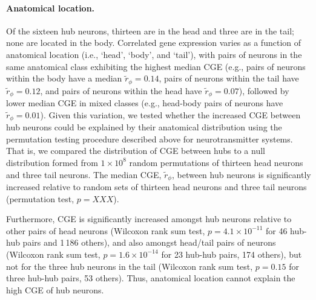 \documentclass[10pt,letterpaper]{article}
\begin{document}
{\paragraph{Anatomical location.}
Of the sixteen hub neurons, thirteen are in the head and three are in the tail; none are located in the body.
Correlated gene expression varies as a function of anatomical location (i.e., `head', `body', and `tail'), with pairs of neurons in the same anatomical class exhibiting the highest median CGE (e.g., pairs of neurons within the body have a median $\tilde{r}_\phi = 0.14$, pairs of neurons within the tail have $\tilde{r}_\phi = 0.12$, and pairs of neurons within the head have $\tilde{r}_\phi = 0.07$), followed by lower median CGE in mixed classes (e.g., head-body pairs of neurons have $\tilde{r}_\phi = 0.01$).
Given this variation, we tested whether the increased CGE between hub neurons could be explained by their anatomical distribution using the permutation testing procedure described above for neurotransmitter systems.
That is, we compared the distribution of CGE between hubs to a null distribution formed from $1 \times 10^8$ random permutations of thirteen head neurons and three tail neurons.
The median CGE, $\tilde{r}_\phi$, between hub neurons is significantly increased relative to random sets of thirteen head neurons and three tail neurons (permutation test, $p = XXX$).

Furthermore, CGE is significantly increased amongst hub neurons relative to other pairs of head neurons (Wilcoxon rank sum test, $p = 4.1 \times 10^{-11}$ for 46 hub-hub pairs and 1\,186 others),
and also amongst head/tail pairs of neurons (Wilcoxon rank sum test, $p = 1.6 \times 10^{-14}$ for 23 hub-hub pairs, 174 others),
but not for the three hub neurons in the tail (Wilcoxon rank sum test, $p = 0.15$ for three hub-hub pairs, 53 others).
Thus, anatomical location cannot explain the high CGE of hub neurons.

}
\end{document}
